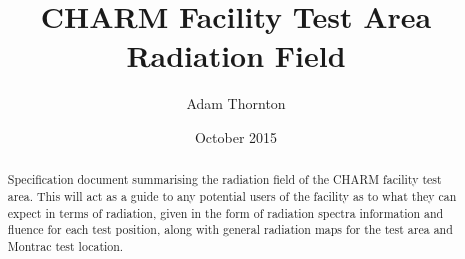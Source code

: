 \documentclass[12pt,a4paper]{report}
\begin{document}


\title{CHARM Facility Test Area Radiation Field}
\date{October 2015}
\author{Adam Thornton}
\maketitle

\begin{abstract}
Specification document summarising the radiation field of the CHARM facility test area. This will act as a guide to any potential users of the facility as to what they can expect in terms of radiation, given in the form of radiation spectra information and fluence for each test position, along with general radiation maps for the test area and Montrac test location. \\
\end{abstract}

\tableofcontents











\appendix


\end{document}
